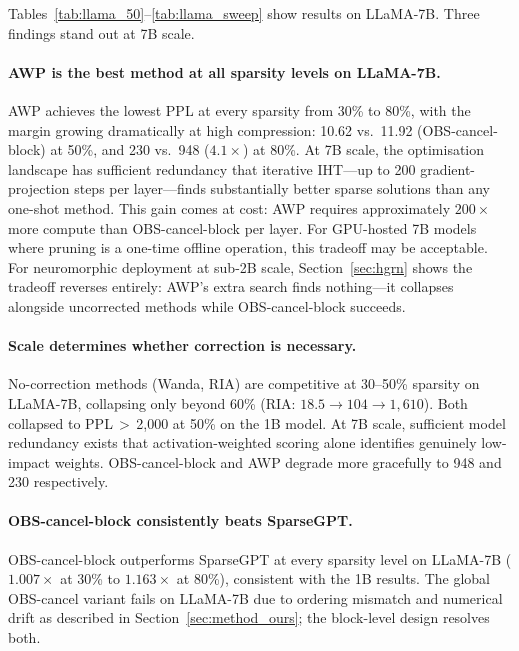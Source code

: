 \documentclass{article}
\begin{document}
Tables~\ref{tab:llama_50}--\ref{tab:llama_sweep} show results on LLaMA-7B.
Three findings stand out at 7B scale.

\paragraph{AWP is the best method at all sparsity levels on LLaMA-7B.}
AWP achieves the lowest PPL at every sparsity from 30\% to 80\%, with the
margin growing dramatically at high compression: 10.62 vs.\ 11.92
(OBS-cancel-block) at 50\%, and 230 vs.\ 948 ($4.1\times$) at 80\%.
At 7B scale, the optimisation landscape has sufficient redundancy that
iterative IHT---up to 200 gradient-projection steps per layer---finds
substantially better sparse solutions than any one-shot method.
This gain comes at cost: AWP requires approximately $200\times$ more compute
than OBS-cancel-block per layer. For GPU-hosted 7B models where pruning is
a one-time offline operation, this tradeoff may be acceptable. For
neuromorphic deployment at sub-2B scale, Section~\ref{sec:hgrn} shows the
tradeoff reverses entirely: AWP's extra search finds nothing---it collapses
alongside uncorrected methods while OBS-cancel-block succeeds.

\paragraph{Scale determines whether correction is necessary.}
No-correction methods (Wanda, RIA) are competitive at 30--50\% sparsity on
LLaMA-7B, collapsing only beyond 60\% (RIA: $18.5 \to 104 \to 1{,}610$).
Both collapsed to PPL\,$>$\,2{,}000 at 50\% on the 1B model. At 7B scale,
sufficient model redundancy exists that activation-weighted scoring alone
identifies genuinely low-impact weights. OBS-cancel-block and AWP degrade
more gracefully to 948 and 230 respectively.

\paragraph{OBS-cancel-block consistently beats SparseGPT.}
OBS-cancel-block outperforms SparseGPT at every sparsity level on LLaMA-7B
($1.007\times$ at 30\% to $1.163\times$ at 80\%), consistent with the 1B
results. The global OBS-cancel variant fails on LLaMA-7B due to ordering
mismatch and numerical drift as described in Section~\ref{sec:method_ours};
the block-level design resolves both.

\end{document}
